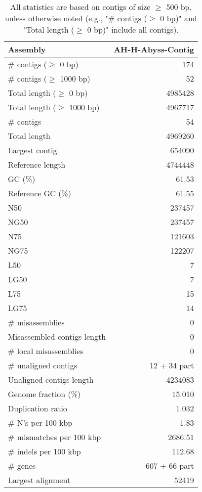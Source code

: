 \documentclass[12pt,a4paper]{article}
\begin{document}
\begin{table}[ht]
\begin{center}
\caption{All statistics are based on contigs of size $\geq$ 500 bp, unless otherwise noted (e.g., "\# contigs ($\geq$ 0 bp)" and "Total length ($\geq$ 0 bp)" include all contigs).}
\begin{tabular}{|l*{1}{|r}|}
\hline
Assembly & AH-H-Abyss-Contig \\ \hline
\# contigs ($\geq$ 0 bp) & 174 \\ \hline
\# contigs ($\geq$ 1000 bp) & 52 \\ \hline
Total length ($\geq$ 0 bp) & 4985428 \\ \hline
Total length ($\geq$ 1000 bp) & 4967717 \\ \hline
\# contigs & 54 \\ \hline
Total length & 4969260 \\ \hline
Largest contig & 654090 \\ \hline
Reference length & 4744448 \\ \hline
GC (\%) & 61.53 \\ \hline
Reference GC (\%) & 61.55 \\ \hline
N50 & 237457 \\ \hline
NG50 & 237457 \\ \hline
N75 & 121603 \\ \hline
NG75 & 122207 \\ \hline
L50 & 7 \\ \hline
LG50 & 7 \\ \hline
L75 & 15 \\ \hline
LG75 & 14 \\ \hline
\# misassemblies & 0 \\ \hline
Misassembled contigs length & 0 \\ \hline
\# local misassemblies & 0 \\ \hline
\# unaligned contigs & 12 + 34 part \\ \hline
Unaligned contigs length & 4234083 \\ \hline
Genome fraction (\%) & 15.010 \\ \hline
Duplication ratio & 1.032 \\ \hline
\# N's per 100 kbp & 1.83 \\ \hline
\# mismatches per 100 kbp & 2686.51 \\ \hline
\# indels per 100 kbp & 112.68 \\ \hline
\# genes & 607 + 66 part \\ \hline
Largest alignment & 52419 \\ \hline
\end{tabular}
\end{center}
\end{table}
\end{document}

